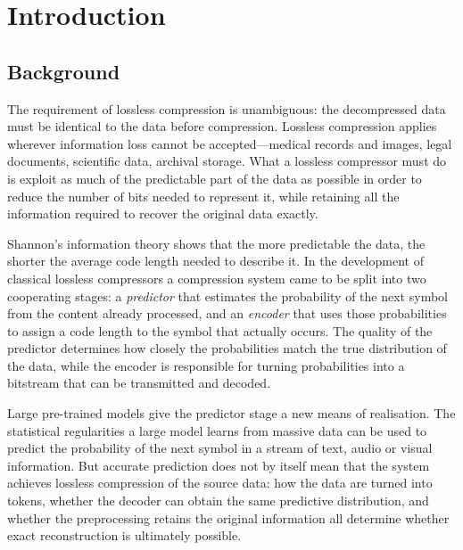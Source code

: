 \documentclass[12pt,a4paper]{article}
\begin{document}
\begin{abstract}
This work shows that part of LMCompress can be reproduced independently: the text base rate
and the audio result are close to the published values. The claimed benefit of LoRA for the
text model could not be reproduced, and the image and video results are not sufficient to
support the paper's conclusion that the procedure is lossless. The conclusions of the
original paper need to be read modality by modality.
\end{abstract}

\section{Introduction}

\subsection{Background}

The requirement of lossless compression is unambiguous: the decompressed data must be
identical to the data before compression. Lossless compression applies wherever information
loss cannot be accepted---medical records and images, legal documents, scientific data,
archival storage. What a lossless compressor must do is exploit as much of the predictable
part of the data as possible in order to reduce the number of bits needed to represent it,
while retaining all the information required to recover the original data exactly.

Shannon's information theory shows that the more predictable the data, the shorter the
average code length needed to describe it. In the development of classical lossless
compressors a compression system came to be split into two cooperating stages: a
\emph{predictor} that estimates the probability of the next symbol from the content already
processed, and an \emph{encoder} that uses those probabilities to assign a code length to
the symbol that actually occurs. The quality of the predictor determines how closely the
probabilities match the true distribution of the data, while the encoder is responsible for
turning probabilities into a bitstream that can be transmitted and decoded.

Large pre-trained models give the predictor stage a new means of realisation. The
statistical regularities a large model learns from massive data can be used to predict the
probability of the next symbol in a stream of text, audio or visual information. But accurate
prediction does not by itself mean that the system achieves lossless compression of the
source data: how the data are turned into tokens, whether the decoder can obtain the same
predictive distribution, and whether the preprocessing retains the original information all
determine whether exact reconstruction is ultimately possible.
\end{document}
